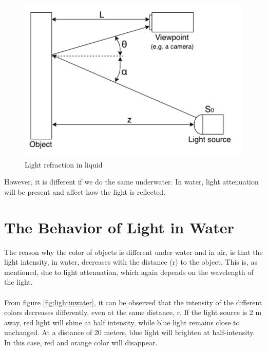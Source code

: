 \begin{figure}[H]
\centering
  \includegraphics[width=12cm]{Images/theory/reflectance.png}
  \caption{Light refraction in liquid}
  \label{fig:reflectance}
\end{figure}



However, it is different if we do the same underwater. In water, light attenuation will be present and affect how the light is reflected.

\section{The Behavior of Light in Water}


The reason why the color of objects is different under water and in air, is that the light intensity, in water, decreases with the distance (r) to the object. This is, as mentioned, due to light attenuation, which again depends on the wavelength of the light. %
\\\\
From figure \ref{fig:lightinwater}, it can be observed that the intensity of the different colors decreases differently, even at the same distance, r. If the light source is 2 m away, red light will shine at half intensity, while blue light remains close to unchanged. At a distance of 20 meters, blue light will brighten at half-intensity. In this case, red and orange color will disappear.

